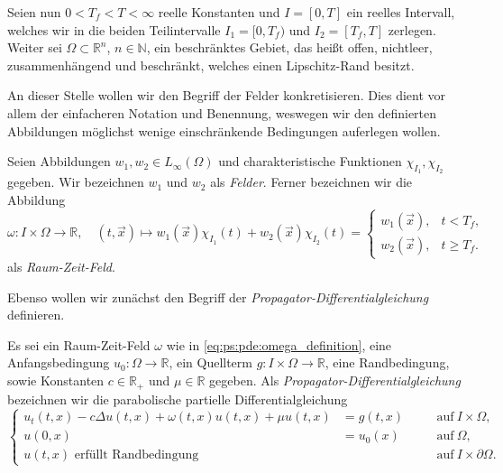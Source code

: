 Seien nun $0 < T_{f} < T < \infty$ reelle Konstanten und $I = [0, T]$ ein reelles Intervall, welches wir in die beiden Teilintervalle $I_{1} = [0, T_{f})$ und $I_{2} = [T_{f}, T]$ zerlegen.
Weiter sei $\Omega \subset \mathbb{R}^{n}$, $n \in \mathbb{N}$, ein beschränktes Gebiet, das heißt offen, nichtleer, zusammenhängend und beschränkt, welches einen Lipschitz-Rand besitzt.

An dieser Stelle wollen wir den Begriff der Felder konkretisieren.
Dies dient vor allem der einfacheren Notation und Benennung, weswegen wir den definierten Abbildungen möglichst wenige einschränkende Bedingungen auferlegen wollen.
\begin{Definition}[Felder]
    Seien Abbildungen $w_{1}, w_{2} \in L_{\infty}(\Omega)$ und charakteristische Funktionen $\chi_{I_{1}}, \chi_{I_{2}}$ gegeben.
    Wir bezeichnen $w_{1}$ und $w_{2}$ als \emph{Felder}.
    Ferner bezeichnen wir die Abbildung
    \begin{equation}
    \label{eq:ps:pde:omega_definition}
        \omega \colon I \times \Omega \to \mathbb{R}, \quad (t, \vec{x}) \mapsto
        w_{1}(\vec{x}) \chi_{I_{1}}(t) + w_{2}(\vec{x}) \chi_{I_{2}}(t)
        =
        \begin{cases}
            w_{1}(\vec{x}), & t < T_{f}, \\
            w_{2}(\vec{x}), & t \geq T_{f}.
        \end{cases}
    \end{equation}
    als \emph{Raum-Zeit-Feld}.
\end{Definition}

Ebenso wollen wir zunächst den Begriff der \emph{Propagator-Differentialgleichung} definieren.

\begin{Definition}
\label{def:ps:pde:propagator_dgl}
    Es sei ein Raum-Zeit-Feld $\omega$ wie in \cref{eq:ps:pde:omega_definition}, eine Anfangsbedingung $u_{0} \colon \Omega \to \mathbb{R}$, ein Quellterm $g \colon I \times \Omega \to \mathbb{R}$, eine Randbedingung, sowie Konstanten $c \in \mathbb{R}_{+}$ und $\mu \in \mathbb{R}$ gegeben.
    Als \emph{Propagator-Differentialgleichung} bezeichnen wir die parabolische partielle Differentialgleichung
    \begin{equation}
    \label{eq:ps:pde:propagator_dgl}
        \left\{
        \begin{aligned}
            u_{t}(t, x) - c \Delta u(t, x) + \omega(t, x) u(t, x) + \mu u(t, x) &= g(t, x) \quad &&\text{auf}~I \times \Omega,\\
            u(0, x) &= u_{0}(x) \quad &&\text{auf}~\Omega, \\
            u(t, x) \text{ erfüllt Randbedingung} &\quad &&\text{auf}~I \times \partial \Omega.
        \end{aligned}
        \right.
    \end{equation}
\end{Definition}

